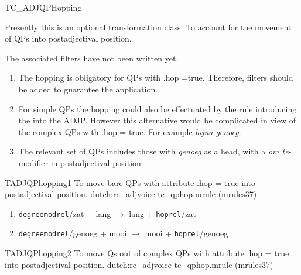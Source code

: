 \newpage
\begin{mruleclass}{TC\_ADJQPHopping}
\begin{classdescr}
\kind Presently this is an optional transformation class.
\classtask To account for the movement of QPs into postadjectival position.

\begin{filters}
\item   The associated filters have not been written yet.
\end{filters}

\nospeedrules

\noplannedrules

\norulesnotince

\classremarks\mbox{}



\begin{enumerate}
\item The hopping is 
obligatory for QPs with .hop =true. Therefore, filters should be added to 
guarantee the application.
\item For simple QPs the hopping could also be 
effectuated by the rule introducing the  into the ADJP. However this 
alternative would be complicated in view of the complex QPs with .hop = true.
For example {\em bijna genoeg}.
  \item 
The relevant set of QPs includes those with {\em genoeg} as a head, with 
a {\em om te}-modifier in postadjectival position.\\

\end{enumerate}
\end{classdescr}

\begin{members}

\begin{member}
 TADJQPhopping1
 To move bare QPs with attribute .hop = true into postadjectival 
position. 
\file dutch:rc\_adjvoice-tc\_qphop.mrule (mrules37)
\semantics \nosemantics
\example \mbox{}\\
\begin{enumerate}
  \item 
{\tt degreemodrel}/zat +  lang $\rightarrow$ lang + {\tt hoprel}/zat 
  \item
{\tt degreemodrel}/genoeg +  mooi $\rightarrow$ mooi + {\tt hoprel}/genoeg
\end{enumerate}
\remarks\mbox{}

\end{member}
\begin{member}
 TADJQPhopping2
 To move Qs out of complex 
QPs with attribute .hop = true into postadjectival position.
\file dutch:rc\_adjvoice-tc\_qphop.mrule (mrules37)
\semantics \nosemantics
\example


\end{member}
\end{members}
\end{mruleclass}
